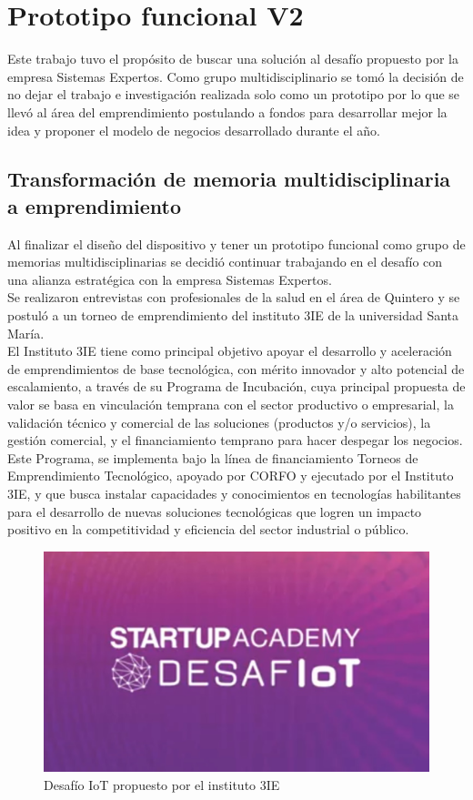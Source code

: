 \chapter{Prototipo funcional V2}\label{proto2}

Este trabajo tuvo el propósito de buscar una solución al desafío propuesto por la empresa Sistemas Expertos. Como grupo multidisciplinario se tomó la decisión de no dejar el trabajo e investigación realizada solo como un prototipo por lo que se llevó al área del emprendimiento postulando a fondos para desarrollar mejor la idea y proponer el modelo de negocios desarrollado durante el año.

\section{Transformación de memoria multidisciplinaria a emprendimiento}
Al finalizar el diseño del dispositivo y tener un prototipo funcional como grupo de memorias multidisciplinarias se decidió continuar trabajando en el desafío con una alianza estratégica con la empresa Sistemas Expertos.\\
Se realizaron entrevistas con profesionales de la salud en el área de Quintero y se postuló a un torneo de emprendimiento del instituto 3IE de la universidad Santa María.\\
El Instituto 3IE tiene como principal objetivo apoyar el desarrollo y aceleración de emprendimientos de base tecnológica, con mérito innovador y alto potencial de escalamiento, a través de su Programa de Incubación, cuya principal propuesta de valor se basa en vinculación temprana con el sector productivo o empresarial, la validación técnico y comercial de las soluciones (productos y/o servicios), la gestión comercial, y el financiamiento temprano para hacer despegar los negocios.\\
Este Programa, se implementa bajo la línea de financiamiento Torneos de Emprendimiento Tecnológico, apoyado por CORFO y ejecutado por el Instituto 3IE, y que busca instalar capacidades y conocimientos en tecnologías habilitantes para el desarrollo de nuevas soluciones tecnológicas que logren un impacto positivo en la competitividad y eficiencia del sector industrial o público.\\

\begin{figure}[H]
\centering
\includegraphics[scale=0.3]{figuras/chamullo/corfo.jpg}
\caption{Desafío IoT propuesto por el instituto 3IE}
\label{3ie}
\end{figure}

